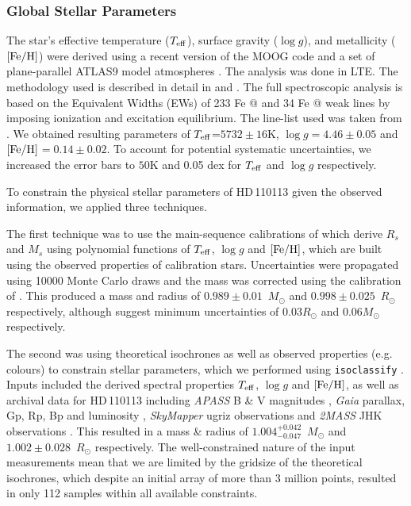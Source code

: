 \documentclass[fleqn,usenatbib]{mnras}
\makeatletter
\newcommand*{\rom}[1]{\expandafter\@slowromancap\romannumeral #1@}
\newcommand{\msun}{\mbox{$M_{\odot}$}}
\newcommand{\rsun}{\mbox{$R_{\odot}$}}
\newcommand{\teff}{$T_{\rm eff}$}
\newcommand{\feh}{\mbox{$\rm [Fe/H]$}}
\newcommand{\logg}{$\log g$}
\newcommand{\Tmstartorres}{ $ 0.989 \pm 0.01 $ }
\newcommand{\Trstartorres}{ $ 0.998 \pm 0.025 $ }
\newcommand{\Tradiso}{ $ 1.002 \pm 0.028 $ }
\newcommand{\Tmassiso}{ $ 1.004^{+0.042}_{-0.047} $ }
\newcommand{\Tstar}{HD\,110113}
\makeatother
\begin{document}
\subsubsection{Global Stellar Parameters}\label{sect:starpars}
The star's effective temperature (\teff{}), surface gravity (\logg{}), and metallicity (\feh{}) were derived using a recent version of the MOOG code \citep{1973ApJ...184..839S} and a set of plane-parallel ATLAS9 model atmospheres  \citep{Kurucz-93}. The analysis was done in LTE. 
The methodology used is described in detail in \citet{2011A&A...533A.141S} and \citet{2013A&A...556A.150S}. 
The full spectroscopic analysis is based on the Equivalent Widths (EWs) of 233 Fe \rom{1} and 34 Fe \rom{2} weak lines by imposing ionization and excitation equilibrium. 
The line-list used was taken from \citet{2008A&A...487..373S}.
We obtained resulting parameters of \teff{}=$5732\pm16$K, \logg{}$=4.46\pm0.05$ and \feh{}$=0.14\pm0.02$.
To account for potential systematic uncertainties, we increased the error bars to $50$K and 0.05 dex for \teff{} and \logg{} respectively.

To constrain the physical stellar parameters of \Tstar{} given the observed information, we applied three techniques.

The first technique was to use the main-sequence calibrations of \citet{2010A&ARv..18...67T} which derive $R_s$ and $M_s$ using polynomial functions of \teff{}, \logg{} and \feh{}, which are built using the observed properties of calibration stars. 
Uncertainties were propagated using 10000 Monte Carlo draws and the mass was corrected using the calibration of \citet{Santos-13}. 
This produced a mass and radius of \Tmstartorres{}\,\msun{} and \Trstartorres{}\,\rsun{} respectively, although \citet{2010A&ARv..18...67T} suggest minimum uncertainties of 0.03\rsun{} and 0.06\msun{} respectively.

The second was using theoretical isochrones \citep[MIST,][]{2016ApJ...823..102C} as well as observed properties (e.g. colours) to constrain stellar parameters, which we performed using \texttt{isoclassify} \citep{2017zndo....573372H,2020AJ....159..280B}.
Inputs included the derived spectral properties \teff{}, \logg{} and \feh{}, as well as archival data for \Tstar{} including {\it APASS} B \& V magnitudes \citep{apass}, {\it Gaia} parallax, Gp, Rp, Bp and luminosity \citep{brown2018gaia}, \textit{SkyMapper} ugriz observations \citep{2020arXiv200810359O} and {\it 2MASS} JHK observations \citep{skrutskie2006two}.
This resulted in a mass \& radius of \Tmassiso{}\,\msun{} and \Tradiso{}\,\rsun{} respectively.
The well-constrained nature of the input measurements mean that we are limited by the gridsize of the theoretical isochrones, which despite an initial array of more than 3 million points, resulted in only 112 samples within all available constraints.
\end{document}
